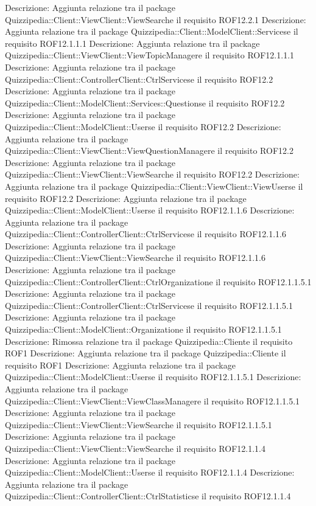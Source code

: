 Descrizione: Aggiunta relazione tra il package Quizzipedia::Client::ViewClient::ViewSearche il requisito ROF12.2.1 
Descrizione: Aggiunta relazione tra il package Quizzipedia::Client::ModelClient::Servicese il requisito ROF12.1.1.1 
Descrizione: Aggiunta relazione tra il package Quizzipedia::Client::ViewClient::ViewTopicManagere il requisito ROF12.1.1.1 
Descrizione: Aggiunta relazione tra il package Quizzipedia::Client::ControllerClient::CtrlServicese il requisito ROF12.2 
Descrizione: Aggiunta relazione tra il package Quizzipedia::Client::ModelClient::Services::Questionse il requisito ROF12.2 
Descrizione: Aggiunta relazione tra il package Quizzipedia::Client::ModelClient::Userse il requisito ROF12.2 
Descrizione: Aggiunta relazione tra il package Quizzipedia::Client::ViewClient::ViewQuestionManagere il requisito ROF12.2 
Descrizione: Aggiunta relazione tra il package Quizzipedia::Client::ViewClient::ViewSearche il requisito ROF12.2 
Descrizione: Aggiunta relazione tra il package Quizzipedia::Client::ViewClient::ViewUserse il requisito ROF12.2 
Descrizione: Aggiunta relazione tra il package Quizzipedia::Client::ModelClient::Userse il requisito ROF12.1.1.6 
Descrizione: Aggiunta relazione tra il package Quizzipedia::Client::ControllerClient::CtrlServicese il requisito ROF12.1.1.6 
Descrizione: Aggiunta relazione tra il package Quizzipedia::Client::ViewClient::ViewSearche il requisito ROF12.1.1.6 
Descrizione: Aggiunta relazione tra il package Quizzipedia::Client::ControllerClient::CtrlOrganizatione il requisito ROF12.1.1.5.1 
Descrizione: Aggiunta relazione tra il package Quizzipedia::Client::ControllerClient::CtrlServicese il requisito ROF12.1.1.5.1 
Descrizione: Aggiunta relazione tra il package Quizzipedia::Client::ModelClient::Organizatione il requisito ROF12.1.1.5.1 
Descrizione: Rimossa relazione tra il package Quizzipedia::Cliente il requisito ROF1 
Descrizione: Aggiunta relazione tra il package Quizzipedia::Cliente il requisito ROF1 
Descrizione: Aggiunta relazione tra il package Quizzipedia::Client::ModelClient::Userse il requisito ROF12.1.1.5.1 
Descrizione: Aggiunta relazione tra il package Quizzipedia::Client::ViewClient::ViewClassManagere il requisito ROF12.1.1.5.1 
Descrizione: Aggiunta relazione tra il package Quizzipedia::Client::ViewClient::ViewSearche il requisito ROF12.1.1.5.1 
Descrizione: Aggiunta relazione tra il package Quizzipedia::Client::ViewClient::ViewSearche il requisito ROF12.1.1.4 
Descrizione: Aggiunta relazione tra il package Quizzipedia::Client::ModelClient::Userse il requisito ROF12.1.1.4 
Descrizione: Aggiunta relazione tra il package Quizzipedia::Client::ControllerClient::CtrlStatisticse il requisito ROF12.1.1.4 
